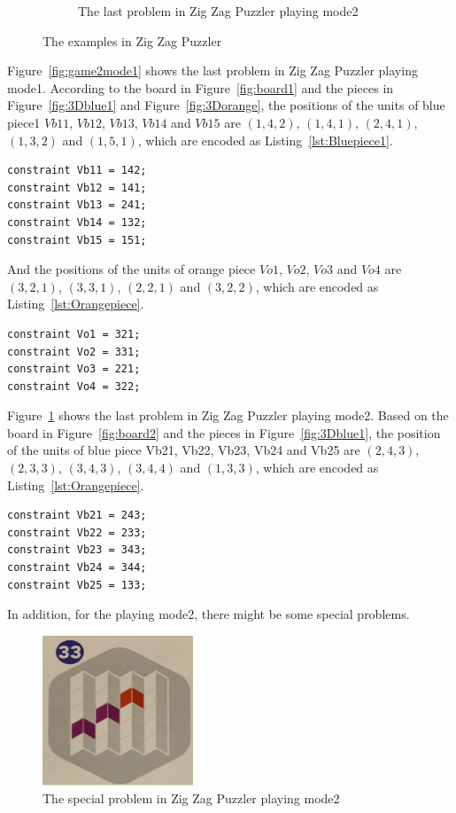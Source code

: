 \begin{figure}[htbp]
\begin{subfigure}[b]{.45\textwidth}
    \caption{The last problem in Zig Zag Puzzler playing mode2}
    \label{fig:game2mode2}
     \end{subfigure}
     \caption{The examples in Zig Zag Puzzler}
     \label{fig:exampleszigzag}
\end{figure}
Figure~\ref{fig:game2mode1} shows the last problem in Zig Zag Puzzler playing mode1. According to the board in Figure~\ref{fig:board1} and the pieces in Figure~\ref{fig:3Dblue1} and Figure~\ref{fig:3Dorange}, the positions of the units of blue piece1 $Vb11$, $Vb12$, $Vb13$, $Vb14$ and $Vb15$ are $(1,4,2)$, $(1,4,1)$, $(2,4,1)$, $(1,3,2)$ and $(1,5,1)$, which are encoded as Listing~\ref{lst:Bluepiece1}.
\begin{lstlisting}[language=minizinc,numbers=none,caption={Encoding for blue piece1's position of last problem in playing mode1},label={lst:Bluepiece1}]
constraint Vb11 = 142;
constraint Vb12 = 141;
constraint Vb13 = 241;
constraint Vb14 = 132;
constraint Vb15 = 151;
\end{lstlisting}
\bigskip
\smallbreak
And the positions of the units of orange piece $Vo1$, $Vo2$, $Vo3$ and $Vo4$ are $(3,2,1)$, $(3,3,1)$, $(2,2,1)$ and $(3,2,2)$, which are encoded as Listing~\ref{lst:Orangepiece}.
\begin{lstlisting}[language=minizinc,numbers=none,caption={Encoding for orange piece's position of last problem in playing mode1},label={lst:Orangepiece}]
constraint Vo1 = 321;
constraint Vo2 = 331;
constraint Vo3 = 221;
constraint Vo4 = 322;
\end{lstlisting}
\bigskip
\smallbreak
Figure~\ref{fig:game2mode2} shows the last problem in Zig Zag Puzzler playing mode2. Based on the board in Figure~\ref{fig:board2} and the pieces in Figure~\ref{fig:3Dblue1}, the position of the units of blue piece Vb21, Vb22, Vb23, Vb24 and Vb25 are $(2,4,3)$, $(2,3,3)$, $(3,4,3)$, $(3,4,4)$ and $(1,3,3)$, which are encoded as Listing~\ref{lst:Orangepiece}.
\begin{lstlisting}[language=minizinc,numbers=none,caption={Encoding for blue piece2's position of last problem in playing mode2},label={lst:Orangepiece}]
constraint Vb21 = 243;
constraint Vb22 = 233;
constraint Vb23 = 343;
constraint Vb24 = 344;
constraint Vb25 = 133;
\end{lstlisting}
\bigskip
\smallbreak
In addition, for the playing mode2, there might be some special problems.
\begin{figure}[htbp]
    \centering
    \includegraphics[width=0.4\textwidth]{figs/specialcase.jpg}
    \caption{The special problem in Zig Zag Puzzler playing mode2}
    \label{fig:specialcase}
\end{figure}
